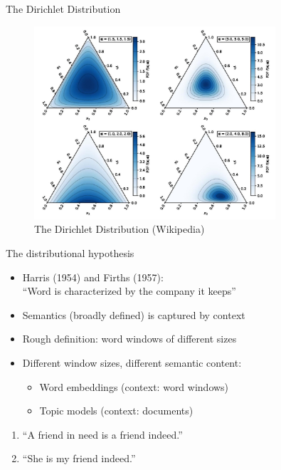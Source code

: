 \documentclass[10pt]{beamer}
\begin{document}
\begin{frame}{The Dirichlet Distribution}


\begin{figure}[h]
\centering
\includegraphics[width=0.8\textwidth]{fig/dirichlet.jpg}
\caption{The Dirichlet Distribution (Wikipedia)}
\end{figure}

\end{frame}



\begin{frame}{The distributional hypothesis}

\begin{itemize}
    \item Harris (1954) and Firths (1957): \\ ``Word is characterized by the company it keeps''
    \pause
    \item Semantics (broadly defined) is captured by {\color{uured} context}\pause
    \item Rough definition: {\color{uured} word windows} of different sizes\pause
    \item Different window sizes, different {\color{uured} semantic} content:
    \begin{itemize}
      \item Word embeddings (context: word windows)
      \item Topic models (context: documents)
    \end{itemize}
\end{itemize}

\begin{example}
\begin{enumerate}
    \item ``A friend in need is a friend indeed.''
    \item ``She is my friend indeed.''
\end{enumerate}
\end{example}
\end{frame}
\end{document}
